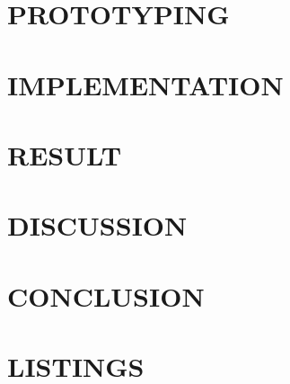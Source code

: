 \documentclass[12pt, twoside]{report}
\makeatletter
\newcommand\AppendixName{Appendix}
\let\oldappendix\appendix
\renewcommand{\appendix}{%
  \oldappendix
  \renewcommand{\chaptername}{\AppendixName}
  \renewcommand{\thechapter}{\@Alph\c@chapter}}
\renewcommand{\bibname}{References}
\makeatother
\begin{document}
\chapter{PROTOTYPING}


\chapter{IMPLEMENTATION}


\chapter{RESULT}


\chapter{DISCUSSION}


\chapter{CONCLUSION}


\renewcommand{\bibname}{References}
\nocite{*}



\appendix
\chapter{LISTINGS}

\end{document}
